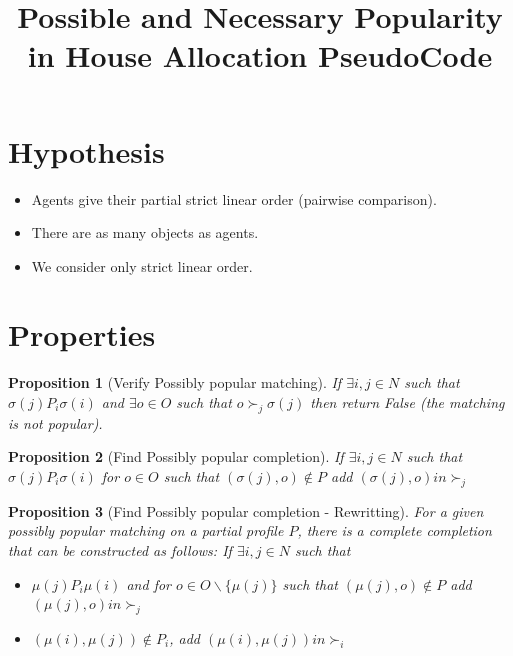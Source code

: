 \documentclass{article}
\title{Possible and Necessary Popularity in House Allocation PseudoCode}
\newtheorem{proposition}{Proposition}
\begin{document}
\maketitle

\section{Hypothesis}
\begin{itemize}
    \item Agents give their partial strict linear order (pairwise comparison).
    \item There are as many objects as agents.
    \item We consider only strict linear order.
\end{itemize}

\section{Properties}

\begin{proposition}[Verify Possibly popular matching]
If $\exists i,j \in N$ such that $\sigma(j) P_i \sigma(i)$ and $\exists o \in O$ such that $o \succ_j \sigma(j) $ then return False (the matching is not popular).
\end{proposition}
\begin{proposition}[Find Possibly popular completion]
If $\exists i,j \in N$ such that $\sigma(j) P_i \sigma(i)$ for $o \in O$ such that $(\sigma(j),o) \notin P$ add $(\sigma(j),o) in \succ_j$
\end{proposition}


\begin{proposition}[Find Possibly popular completion - Rewritting]
For a given possibly popular matching on a partial profile $P$, there is a complete completion that can be constructed as follows:
If $\exists i,j \in N$ such that
\begin{itemize}
    \item $\mu(j) P_i \mu(i)$ and for $o \in O \backslash \{\mu(j)\}$ such that $(\mu(j),o) \notin P$ add $(\mu(j),o) in \succ_j$
    \item $(\mu(i), \mu(j)) \notin P_i$, add $(\mu(i),\mu(j)) in \succ_i$
\end{itemize}
\end{proposition}
\end{document}
